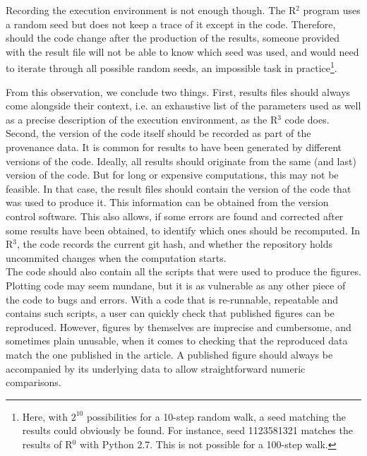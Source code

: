 \documentclass[a4paper,11pt]{article}
\begin{document}
Recording the execution environment is not enough though. The R$^2$ program uses a random seed but does not keep a trace of it except in the code. Therefore, should the code change after the production of the results, someone provided with the result file will not be able to know which seed was used, and would need to iterate through all possible random seeds, an impossible task in practice\footnote{Here, with $2^{10}$ possibilities for a 10-step random walk, a seed matching the results could obviously be found. For instance, seed 1123581321 matches the results of R$^0$ with Python 2.7. This is not possible for a 100-step walk.}.

From this observation, we conclude two things. First, results files should always come alongside their context, i.e. an exhaustive list of the parameters used as well as a precise description of the execution environment, as the R$^3$ code does. Second, the version of the code itself should be recorded as part of the provenance data. It is common for results to have been generated by different versions of the code. Ideally, all results should originate from the same (and last) version of the code. But for long or expensive computations, this may not be feasible. In that case, the result files should contain the version of the code that was used to produce it. This information can be obtained from the version control software. This also allows, if some errors are found and corrected after some results have been obtained, to identify which ones should be recomputed. In R$^3$, the code records the current git hash, and whether the repository holds uncommited changes when the computation starts.\\

The code should also contain all the scripts that were used to produce the figures. Plotting code may seem mundane, but it is as vulnerable as any other piece of the code to bugs and errors. With a code that is re-runnable, repeatable and contains such scripts, a user can quickly check that published figures can be reproduced. However, figures by themselves are imprecise and cumbersome, and sometimes plain unusable, when it comes to checking that the reproduced data match the one published in the article. A published figure should always be accompanied by its underlying data to allow straightforward numeric comparisons.\\
\end{document}
